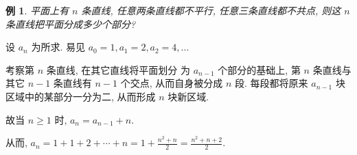 \documentclass[punct]{ctexbeamer}
\newtheorem{ex}{例}[section]
\def\sol{\noindent {\bf 解\ }}
\begin{document}
\begin{frame}
\begin{ex}
平面上有 $n$ 条直线, 任意两条直线都不平行, 任意三条直线都不共点, 则这 $n$ 条直线把平面分成多少个部分?
\end{ex}
\pause
\sol
设 $a_n$ 为所求. 易见 $a_0=1, a_1=2, a_2=4, \ldots$

考察第 $n$ 条直线, 在其它直线将平面划分 为 $a_{n-1}$ 个部分的基础上, 第 $n$ 条直线与其它 $n-1$ 条直线有 $n-1$ 个交点, 从而自身被分成 $n$ 段. 每段都将原来 $a_{n-1}$ 块区域中的某部分一分为二, 从而形成 $n$ 块新区域.

故当 $n \geq 1$ 时, $a_n=a_{n-1}+n$.

从而, $a_n=1+1 +2+\cdots+n=1+ \frac{n^2+n}{2}=\frac{n^2+n+2}{2}$.
\end{frame}
%
\end{document}
